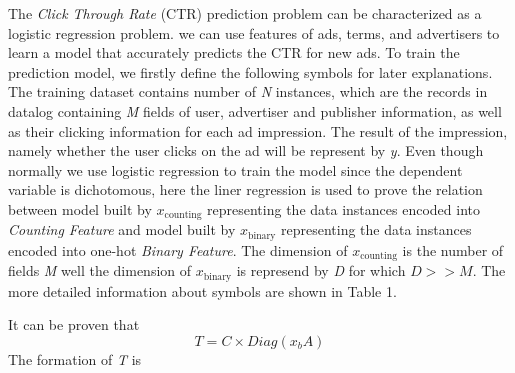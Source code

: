 \documentclass{sig-alternate}
\begin{document}
The \textsl{Click Through Rate} (CTR) prediction problem can be characterized as a logistic regression problem. we can use features of ads, terms, and advertisers to learn a model that accurately predicts the CTR for new ads. To train the prediction model, we firstly define the following symbols for later explanations.\vspace{5mm}
The training dataset contains number of \textsl{N} instances, which are the records in datalog containing \textsl{M} fields of user, advertiser and publisher information, as well as their clicking information for each ad impression. The result of the impression, namely whether the user clicks on the ad will be represent by \textsl{y}. Even though normally we use logistic regression to train the model since the dependent variable is dichotomous, here the liner regression is used to prove the relation between model built by \(x_{\text{counting}}\) representing the data instances encoded into \textsl{Counting Feature} and model built by \(x_{\text{binary}}\) representing the data instances encoded into one-hot \textsl{Binary Feature}. The dimension of \(x_{\text{counting}}\) is the number of fields \textsl{M} well the dimension of \(x_{\text{binary}}\) is represend by \textsl{D} for which \(D >> M\). The more detailed information about symbols are shown in Table 1.

 It can be proven that 
\[ T = C\times Diag(x_{b}A) \]
The formation of \textsl{T} is 
\end{document}
